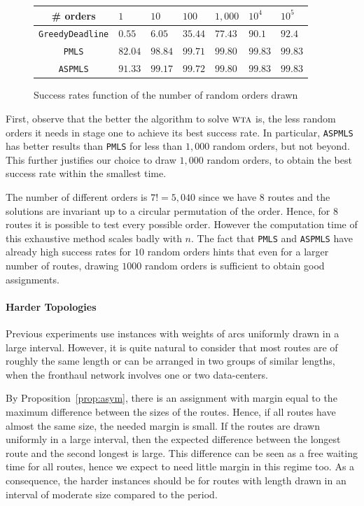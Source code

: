 \documentclass[a4paper,10pt]{article}
\newcommand\greedydeadline{\texttt{GreedyDeadline}\xspace}
\newcommand\PMLS{\texttt{PMLS}\xspace}
\newcommand\ASPMLS{\texttt{ASPMLS}\xspace}
\newcommand\wta{\textsc{wta}\xspace}
\begin{document}
         \begin{figure}[h] 
       \begin{center}
   \begin{tabularx}{0.8\textwidth}{|c|X|X|X|X|X|X|}
    \hline
    \# orders& $1$ & $10$ & $100$& $1,000$& $10^{4}$&$10^{5}$\\
    \hline
    \greedydeadline & $0.55$ &$6.05$&$35.44$&$77.43$&$90.1$&$92.4$\\
    \hline
    \PMLS & $82.04$ &$98.84$&$99.71$&$99.80$&$99.83$&$99.83$\\
    \hline
    \ASPMLS & $91.33$&$99.17$&$99.72$&$99.80$ &$99.83$&$99.83$\\
    \hline
      \end{tabularx}
      \end{center}
   \caption{Success rates function of the number of random orders drawn}
        \label{fig:randomdrawing}
     \end{figure}

	First, observe that the better the algorithm to solve $\wta$ is, the less random orders it needs in stage one to achieve its best success rate. In particular, \ASPMLS has better results than \PMLS for less than $1,000$ random orders, but not beyond. This further justifies our choice to draw $1,000$ random orders, to obtain the best success rate within the smallest time.

	The number of different orders is $7!= 5,040$ since we have $8$ routes and the solutions are invariant up to a circular permutation of the order. Hence, for $8$ routes it is possible to test every possible order. However the computation time of this exhaustive method scales badly with $n$. The fact that \PMLS and \ASPMLS have already high success rates for $10$ random orders hints that even for a larger number of routes, drawing $1000$ random orders is sufficient to obtain good assignments.


     \paragraph{Harder Topologies}
     
    Previous experiments use instances with weights of arcs uniformly drawn in a large interval. However, it is quite natural to consider that most routes are of roughly the same length or can be arranged in two groups of similar lengths, when the fronthaul network involves one or two data-centers.
    
By Proposition~\ref{prop:asym}, there is an assignment with margin equal to the maximum difference
      between the sizes of the routes. Hence, if all routes have almost the same size, the needed margin is small. If the routes are drawn uniformly in a large interval, then the expected difference between the longest route and the second longest is large. This difference can be seen as a free waiting time for all routes, hence we expect to need little margin in this regime too. As a consequence, the harder instances should be for routes with length drawn in an interval of moderate size compared to the period.
\end{document}
